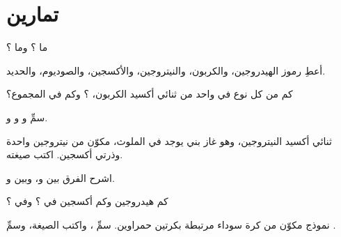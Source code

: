 \section{تمارين}

\begin{exercise}[$\star$]\label{exo:g7:atoms-and-molecules:1}
ما ؟ وما ؟
\end{exercise}

\begin{exercise}[$\star$]\label{exo:g7:atoms-and-molecules:2}
أعطِ رموز الهيدروجين، والكربون، والنيتروجين، والأكسجين، والصوديوم،
والحديد.
\end{exercise}

\begin{exercise}[$\star$]\label{exo:g7:atoms-and-molecules:3}
كم  من كل نوع في  واحد من ثنائي أكسيد الكربون،
؟ وكم  في المجموع؟
\end{exercise}

\begin{exercise}[$\star$]\label{exo:g7:atoms-and-molecules:4}
سمِّ   و و و.
\end{exercise}

\begin{exercise}[$\star$]\label{exo:g7:atoms-and-molecules:5}
 ثنائي أكسيد النيتروجين، وهو غاز بني يوجد في  الملوث، مكوّن من
 نيتروجين واحدة وذرتي أكسجين. اكتب صيغته.
\end{exercise}

\begin{exercise}[$\star\star$]\label{exo:g7:atoms-and-molecules:6}
اشرح الفرق بين  و، وبين 
و.
\end{exercise}

\begin{exercise}[$\star\star$]\label{exo:g7:atoms-and-molecules:7}
كم  هيدروجين وكم  أكسجين في
؟ وفي ؟
\end{exercise}

\begin{exercise}[$\star\star$]\label{exo:g7:atoms-and-molecules:8}
نموذج مكوّن من كرة سوداء مرتبطة بكرتين حمراوين. سمِّ ، واكتب
الصيغة، وسمِّ .
\end{exercise}

